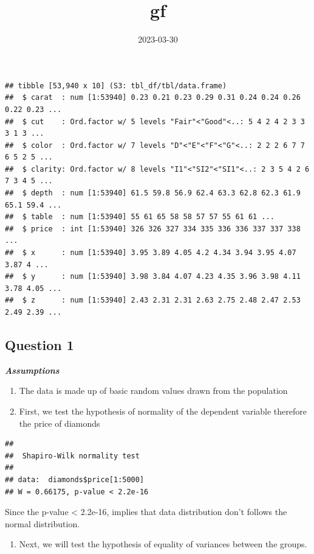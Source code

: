 \documentclass[
]{article}
\title{gf}
\author{}
\date{\vspace{-2.5em}2023-03-30}
\providecommand{\tightlist}{%
  \setlength{\itemsep}{0pt}\setlength{\parskip}{0pt}}
\begin{document}
\maketitle

\begin{verbatim}
## tibble [53,940 x 10] (S3: tbl_df/tbl/data.frame)
##  $ carat  : num [1:53940] 0.23 0.21 0.23 0.29 0.31 0.24 0.24 0.26 0.22 0.23 ...
##  $ cut    : Ord.factor w/ 5 levels "Fair"<"Good"<..: 5 4 2 4 2 3 3 3 1 3 ...
##  $ color  : Ord.factor w/ 7 levels "D"<"E"<"F"<"G"<..: 2 2 2 6 7 7 6 5 2 5 ...
##  $ clarity: Ord.factor w/ 8 levels "I1"<"SI2"<"SI1"<..: 2 3 5 4 2 6 7 3 4 5 ...
##  $ depth  : num [1:53940] 61.5 59.8 56.9 62.4 63.3 62.8 62.3 61.9 65.1 59.4 ...
##  $ table  : num [1:53940] 55 61 65 58 58 57 57 55 61 61 ...
##  $ price  : int [1:53940] 326 326 327 334 335 336 336 337 337 338 ...
##  $ x      : num [1:53940] 3.95 3.89 4.05 4.2 4.34 3.94 3.95 4.07 3.87 4 ...
##  $ y      : num [1:53940] 3.98 3.84 4.07 4.23 4.35 3.96 3.98 4.11 3.78 4.05 ...
##  $ z      : num [1:53940] 2.43 2.31 2.31 2.63 2.75 2.48 2.47 2.53 2.49 2.39 ...
\end{verbatim}

\hypertarget{question-1}{%
\subsection{Question 1}\label{question-1}}

\textbf{\emph{Assumptions}}

\begin{enumerate}
\def\labelenumi{\arabic{enumi}.}
\item
  The data is made up of basic random values drawn from the population
\item
  First, we test the hypothesis of normality of the dependent variable
  therefore the price of diamonds
\end{enumerate}

\begin{verbatim}
## 
##  Shapiro-Wilk normality test
## 
## data:  diamonds$price[1:5000]
## W = 0.66175, p-value < 2.2e-16
\end{verbatim}

Since the p-value \textless{} 2.2e-16, implies that data distribution
don't follows the normal distribution.

\begin{enumerate}
\def\labelenumi{\arabic{enumi}.}
\setcounter{enumi}{2}
\tightlist
\item
  Next, we will test the hypothesis of equality of variances between the
  groups.
\end{enumerate}
\end{document}
